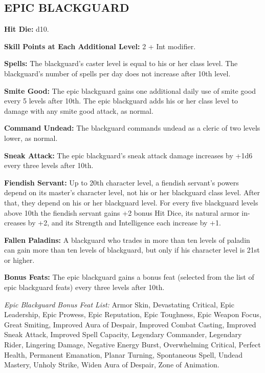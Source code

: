 \documentclass{article}
\begin{document}
\vspace{24pt}
\subsection*{{\LARGE{}EPIC BLACKGUARD}}

\textbf{Hit Die:} d10. 

\textbf{Skill Points at Each Additional Level:} 2 + Int modifier.

\textbf{Spells:} The blackguard's caster level is equal to his or her class level. 
The blackguard's number of spells per day does not increase after 10th level. 

\textbf{Smite Good:} The epic blackguard gains one additional daily use of smite 
good every 5 levels after 10th.  The epic blackguard adds his or her class level 
to damage with any smite good attack, as normal. 

\textbf{Command Undead:} The blackguard commands undead as a cleric of two levels 
lower, as normal. 

\textbf{Sneak Attack:} The epic blackguard's sneak attack damage increases by +1d6 
every three levels after 10th. 

\textbf{Fiendish Servant:} Up to 20th character level, a fiendish servant's powers 
depend on its master's character level, not his or her blackguard class level. 
After that, they depend on his or her blackguard level. For every five blackguard 
levels above 10th the fiendish servant gains +2 bonus Hit Dice, its natural armor 
in-creases by +2, and its Strength and Intelligence each increase by +1. 

\textbf{Fallen Paladins:} A blackguard who trades in more than ten levels of paladin 
can gain more than ten levels of blackguard, but only if his character level is 
21st or higher. 

\textbf{Bonus Feats:} The epic blackguard gains a bonus feat (selected from the 
list of epic blackguard feats) every three levels after 10th. 

\textit{Epic Blackguard Bonus Feat List: }Armor Skin, Devastating Critical, Epic 
Leadership, Epic Prowess, Epic Reputation, Epic Toughness, Epic Weapon Focus, Great 
Smiting, Improved Aura of Despair, Improved Combat Casting, Improved Sneak Attack, 
Improved Spell Capacity, Legendary Commander, Legendary Rider, Lingering Damage, 
Negative Energy Burst, Overwhelming Critical, Perfect Health, Permanent Emanation, 
Planar Turning, Spontaneous Spell, Undead Mastery, Unholy Strike, Widen Aura of 
Despair, Zone of Animation. 
\end{document}

